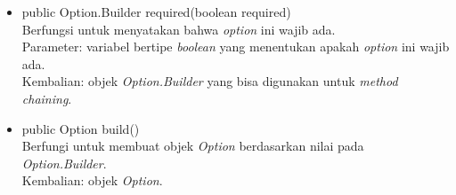 \begin{itemize}
\item public Option.Builder required(boolean required)\\
Berfungsi untuk menyatakan bahwa \textit{option} ini wajib ada.\\
Parameter: variabel bertipe \textit{boolean} yang menentukan apakah \textit{option} ini wajib ada.\\
Kembalian: objek \textit{Option.Builder} yang bisa digunakan untuk \textit{method chaining}.

\item public Option build()\\
Berfungi untuk membuat objek \textit{Option} berdasarkan nilai pada \textit{Option.Builder}.\\
Kembalian: objek \textit{Option}.

\end{itemize}


